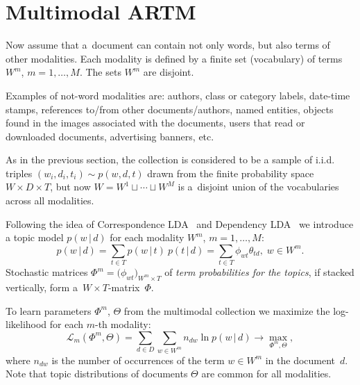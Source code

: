 \documentclass{acm_proc_article-sp}
\newcommand{\cond}{\mspace{3mu}{|}\mspace{3mu}}
\newcommand{\cL}{\mathscr{L}}
\begin{document}
\section{Multimodal ARTM}
\label{sec:Multimodal}


Now assume that
a~document can contain not only words, but also terms of other modalities.
Each modality is defined by a finite set (vocabulary) of terms $W^m$, ${m=1,\dots,M}$.
The sets $W^m$ are disjoint.

Examples of not-word modalities are:
authors,
class or category labels,
date-time stamps,
references to/from other documents/authors,
named entities,
objects found in the images associated with the documents,
users that read or downloaded documents,
advertising banners,
etc.

As in the previous section,
the collection is considered to be a sample of i.i.d. triples
$(w_i,d_i,t_i) \sim p(w,d,t)$
drawn from the finite probability space $W\times D \times T$,
but now ${W=W^1\sqcup\cdots\sqcup W^M}$
is a~disjoint union of the vocabularies across all modalities.

Following the idea of Correspondence LDA~\cite{blei03modeling}
and Dependency LDA~\cite{rubin12statistical}
we introduce a topic model $p(w\cond d)$
for each modality $W^m$,\; $m=1,\dots,M$:
\[
    p(w\cond d)
    = \sum_{t\in T} p(w\cond t)\: p(t\cond d)
    = \sum_{t\in T} \phi_{wt} \theta_{td},\;
    w\in W^m.
\]
Stochastic matrices ${\Phi^m = \bigl( \phi_{wt} \bigr)_{W^m\times T}}$
of \emph{term probabilities for the topics},
if stacked vertically, form a~${W\!\!\times\!T}$-matrix~$\Phi$.

To learn parameters $\Phi^m$, $\Theta$ from the multimodal collection
we maximize the log-likelihood for each $m$-th modality:
\[
    \cL_m (\Phi^m,\Theta) =
    \sum_{d\in D}\sum_{w\in W^m} n_{dw} \ln p(w\cond d)
    \to \max_{\Phi^m,\Theta},
\]
where
$n_{dw}$ is the number of occurrences of the term ${w\in W^m}$ in the document~$d$.
Note that topic distributions of documents $\Theta$ are common for all modalities.
\end{document}
